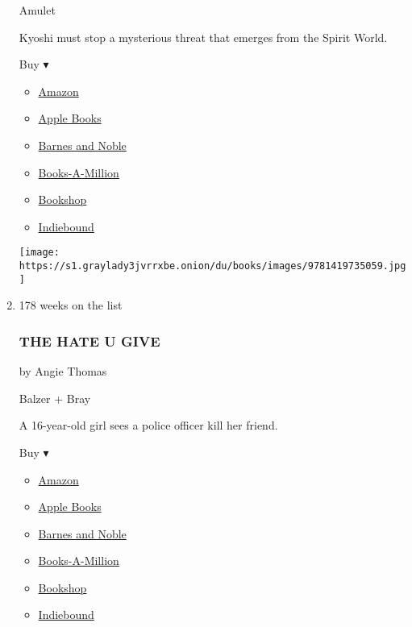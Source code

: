 \begin{enumerate}
  Amulet

  Kyoshi must stop a mysterious threat that emerges from the Spirit
  World.

  Buy ▾

  \begin{itemize}
  \tightlist
  \item
    \href{https://www.amazon.com/dp/1419735055?tag=NYTBSREV-20\&tag=NYTBS-20}{Amazon}
  \item
    \href{https://du-gae-books-dot-nyt-du-prd.appspot.com/buy?title=AVATAR\%2C+THE+LAST+AIRBENDER\%3A+THE+SHADOW+OF+KYOSHI\&author=FC+Yee}{Apple
    Books}
  \item
    \href{https://www.anrdoezrs.net/click-7990613-11819508?url=https\%3A\%2F\%2Fwww.barnesandnoble.com\%2Fw\%2F\%3Fean\%3D9781419735059}{Barnes
    and Noble}
  \item
    \href{https://www.anrdoezrs.net/click-7990613-35140?url=https\%3A\%2F\%2Fwww.booksamillion.com\%2Fp\%2FAVATAR\%252C\%2BTHE\%2BLAST\%2BAIRBENDER\%253A\%2BTHE\%2BSHADOW\%2BOF\%2BKYOSHI\%2FFC\%2BYee\%2F9781419735059}{Books-A-Million}
  \item
    \href{https://bookshop.org/a/3546/9781419735059}{Bookshop}
  \item
    \href{https://www.indiebound.org/book/9781419735059?aff=NYT}{Indiebound}
  \end{itemize}

  \texttt{[image: https://s1.graylady3jvrrxbe.onion/du/books/images/9781419735059.jpg]}
\item
  178 weeks on the list

  \hypertarget{the-hate-u-give}{%
  \subsubsection{THE HATE U GIVE}\label{the-hate-u-give}}

  by Angie Thomas

  Balzer + Bray

  A 16-year-old girl sees a police officer kill her friend.

  Buy ▾

  \begin{itemize}
  \tightlist
  \item
    \href{https://www.amazon.com/Hate-U-Give-Angie-Thomas/dp/0062498533?tag=NYTBS-20}{Amazon}
  \item
    \href{https://du-gae-books-dot-nyt-du-prd.appspot.com/buy?title=THE+HATE+U+GIVE\&author=Angie+Thomas}{Apple
    Books}
  \item
    \href{https://www.anrdoezrs.net/click-7990613-11819508?url=https\%3A\%2F\%2Fwww.barnesandnoble.com\%2Fw\%2F\%3Fean\%3D9780062498533}{Barnes
    and Noble}
  \item
    \href{https://www.anrdoezrs.net/click-7990613-35140?url=https\%3A\%2F\%2Fwww.booksamillion.com\%2Fp\%2FTHE\%2BHATE\%2BU\%2BGIVE\%2FAngie\%2BThomas\%2F9780062498533}{Books-A-Million}
  \item
    \href{https://bookshop.org/a/3546/9780062498533}{Bookshop}
  \item
    \href{https://www.indiebound.org/book/9780062498533?aff=NYT}{Indiebound}
  \end{itemize}


\end{enumerate}
